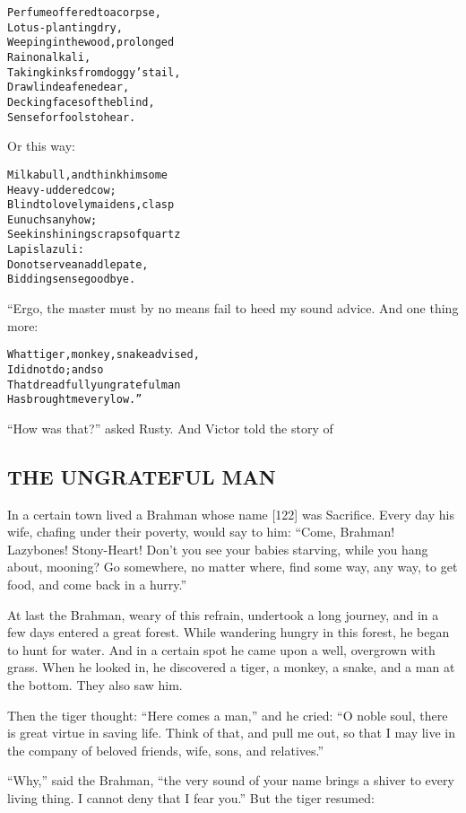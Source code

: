 \documentclass{article}
\renewenvironment{verbatim}{\begin{alltt}\normalfont\begin{centering}}{\end{centering}\end{alltt}}
\begin{document}
\begin{verbatim}
Perfume offered to a corpse,
    Lotus-planting dry,
Weeping in the wood, prolonged
    Rain on alkali,
Taking kinks from doggy's tail,
    Drawl in deafened ear,
Decking faces of the blind,
    Sense for fools to hear.
\end{verbatim}
Or this way:

\begin{verbatim}
Milk a bull, and think him some
    Heavy-uddered cow;
Blind to lovely maidens, clasp
    Eunuchs anyhow;
Seek in shining scraps of quartz
    Lapis lazuli:
Do not serve an addlepate,
    Bidding sense goodbye.
\end{verbatim}
“Ergo, the master must by no means fail to heed my sound advice.
And one thing more:

\begin{verbatim}
What tiger, monkey, snake advised,
    I did not do; and so
That dreadfully ungrateful man
    Has brought me very low.”
\end{verbatim}
``How was that?'' asked Rusty. And Victor told the story of

\subsection{THE UNGRATEFUL MAN}

In a certain town lived a Brahman whose name [122] was Sacrifice.
Every day his wife, chafing under their poverty, would say to him:
``Come, Brahman! Lazybones! Stony-Heart! Don't you see your babies starving, while you hang about, mooning? Go somewhere, no matter where, find some way, any way, to get food, and come back in a hurry.''

At last the Brahman, weary of this refrain, undertook a long
journey, and in a few days entered a great forest. While wandering
hungry in this forest, he began to hunt for water. And in a certain
spot he came upon a well, overgrown with grass. When he looked in,
he discovered a tiger, a monkey, a snake, and a man at the bottom.
They also saw him.

Then the tiger thought: ``Here comes a man,'' and he cried:
``O noble soul, there is great virtue in saving life. Think of that, and pull me out, so that I may live in the company of beloved friends, wife, sons, and relatives.''

``Why,'' said the Brahman,
``the very sound of your name brings a shiver to every living thing. I cannot deny that I fear you.''
But the tiger resumed:
\end{document}

